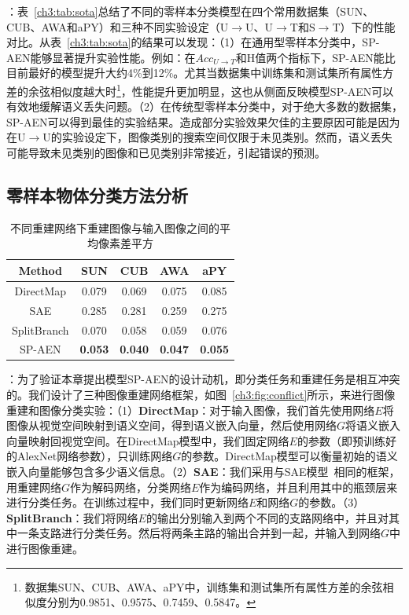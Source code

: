 \textbf{}：表~\ref{ch3:tab:sota}总结了不同的零样本分类模型在四个常用数据集（SUN、CUB、AWA和aPY）和三种不同实验设定（U$\to$U、U$\to$T和S$\to$T）下的性能对比。从表~\ref{ch3:tab:sota}的结果可以发现：（1）在通用型零样本分类中，SP-AEN能够显著提升实验性能。例如：在$Acc_{U\to T}$和H值两个指标下，SP-AEN能比目前最好的模型提升大约4\%到12\%。尤其当数据集中训练集和测试集所有属性方差的余弦相似度越大时\footnote{数据集SUN、CUB、AWA、aPY中，训练集和测试集所有属性方差的余弦相似度分别为0.9851、0.9575、0.7459、0.5847。}，性能提升更加明显，这也从侧面反映模型SP-AEN可以有效地缓解语义丢失问题。（2）在传统型零样本分类中，对于绝大多数的数据集，SP-AEN可以得到最佳的实验结果。造成部分实验效果欠佳的主要原因可能是因为在U$\to$U的实验设定下，图像类别的搜索空间仅限于未见类别。然而，语义丢失可能导致未见类别的图像和已见类别非常接近，引起错误的预测。

\subsection{零样本物体分类方法分析}

\begin{table}[t]
\centering
\begin{tabular}{|c | c| c| c| c|}
\hline
Method & \textbf{SUN} & \textbf{CUB} & \textbf{AWA} & \textbf{aPY} \\
\hline
 DirectMap & 0.079 & 0.069 & 0.075 & 0.085 \\
 SAE & 0.285 & 0.281 & 0.259 &  0.275\\
SplitBranch & 0.070 & 0.058  & 0.059 & 0.076 \\
SP-AEN & \textbf{0.053}  & \textbf{0.040}& \textbf{0.047} & \textbf{0.055} \\
\hline
\end{tabular}
\caption{不同重建网络下重建图像与输入图像之间的平均像素差平方}
\label{ch3:tab:conflict_quantitative}
\end{table}

\textbf{}：为了验证本章提出模型SP-AEN的设计动机，即分类任务和重建任务是相互冲突的。我们设计了三种图像重建网络框架，如图~\ref{ch3:fig:conflict}所示，来进行图像重建和图像分类实验：（1）\textbf{DirectMap}：对于输入图像，我们首先使用网络$E$将图像从视觉空间映射到语义空间，得到语义嵌入向量，然后使用网络$G$将语义嵌入向量映射回视觉空间。在DirectMap模型中，我们固定网络$E$的参数（即预训练好的AlexNet网络参数），只训练网络$G$的参数。DirectMap模型可以衡量初始的语义嵌入向量能够包含多少语义信息。（2）\textbf{SAE}：我们采用与SAE模型~\cite{kodirov2017semantic}相同的框架，用重建网络$G$作为解码网络，分类网络$E$作为编码网络，并且利用其中的瓶颈层来进行分类任务。在训练过程中，我们同时更新网络$E$和网络$G$的参数。（3）\textbf{SplitBranch}：我们将网络$E$的输出分别输入到两个不同的支路网络中，并且对其中一条支路进行分类任务。然后将两条主路的输出合并到一起，并输入到网络$G$中进行图像重建。

